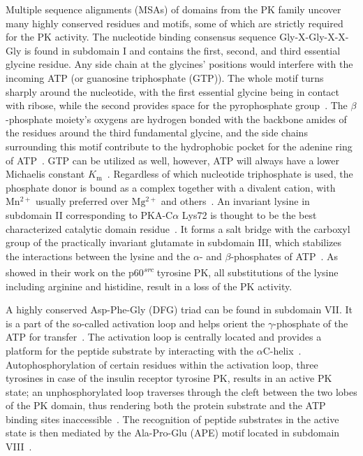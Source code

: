   Multiple sequence alignments (MSAs) of domains from the PK family uncover many highly
  conserved residues and motifs, some of which are strictly required for the PK activity.
  The nucleotide binding consensus sequence Gly-X-Gly-X-X-Gly is found in subdomain I and
  contains the first, second, and third essential glycine residue.
  Any side chain at the glycines' positions would interfere with the incoming ATP
  (or guanosine triphosphate (GTP)).
  The whole motif turns sharply around the nucleotide, with the first essential glycine
  being in contact with ribose, while the second provides space for the pyrophosphate
  group~\cite{wierenga1983predicted, hanks1988protein}.
  The $\beta$-phosphate moiety's oxygens are hydrogen bonded with the backbone amides of
  the residues around the third fundamental glycine, and the side chains surrounding this
  motif contribute to the hydrophobic pocket for the adenine ring of
  ATP~\cite{hanks1995eukaryotic}.
  GTP can be utilized as well, however, ATP will always have a lower Michaelis constant
  $K_{\mathrm{m}}$~\cite{hunter1985protein}.
  Regardless of which nucleotide triphosphate is used, the phosphate donor is bound as a
  complex together with a divalent cation, with $\mathrm{Mn^{2+}}$ usually preferred over
  $\mathrm{Mg^{2+}}$ and
  others~\cite{witte1980abelson, richert1979characterization, wong1984purification}.
  An invariant lysine in subdomain II corresponding to PKA-C$\alpha$ Lys72 is thought to
  be the best characterized catalytic domain residue~\cite{hanks1988protein}.
  It forms a salt bridge with the carboxyl group of the practically invariant glutamate in
  subdomain III, which stabilizes the interactions between the lysine and the $\alpha$-
  and $\beta$-phosphates of ATP~\cite{hanks1995eukaryotic}.
  As \citet{kamps1986neither} showed in their work on the
  p60\textsuperscript{\textit{src}} tyrosine PK, all substitutions of the lysine including
  arginine and histidine, result in a loss of the PK activity.

  A highly conserved Asp-Phe-Gly (DFG) triad can be found in subdomain VII.
  It is a part of the so-called activation loop and helps orient the $\gamma$-phosphate of
  the ATP for transfer~\cite{hanks1995eukaryotic}.
  The activation loop is centrally located and provides a platform for the peptide
  substrate by interacting with the
  $\alpha$C-helix~\cite{huse2002conformational, mobitz2015abc}.
  Autophosphorylation of certain residues within the activation loop, three tyrosines in
  case of the insulin receptor tyrosine PK, results in an active PK state; an
  unphosphorylated loop traverses through the cleft between the two lobes of the PK
  domain, thus rendering both the protein substrate and the ATP binding sites
  inaccessible~\cite{hubbard1997crystal}.
  The recognition of peptide substrates in the active state is then mediated by the
  Ala-Pro-Glu (APE) motif located in subdomain VIII~\cite{hanks1995eukaryotic}.

